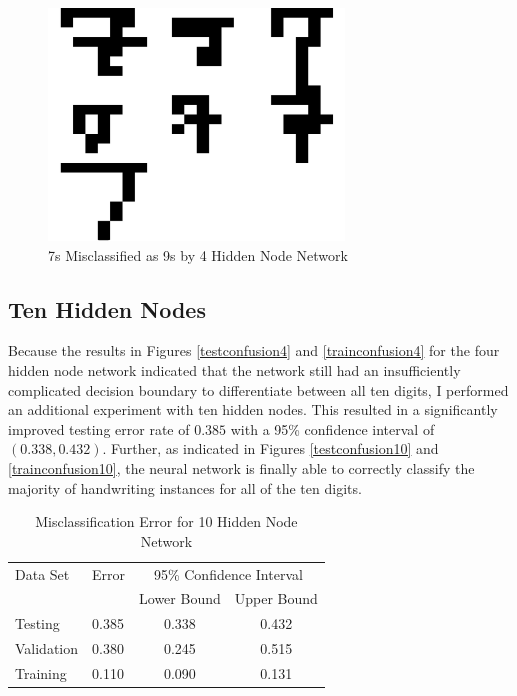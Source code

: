 \documentclass{article}
\begin{document}
\begin{figure}
\centering
\includegraphics[width=0.7\textwidth]{data/final/4_test_7missclass9.png}
\caption{7s Misclassified as 9s by 4 Hidden Node Network}
\label{4_7missclass9}
\end{figure}

\subsection{Ten Hidden Nodes}\label{hidden10}

Because the results in Figures \ref{testconfusion4} and \ref{trainconfusion4} for the four hidden node network indicated that the network still had an insufficiently complicated decision boundary to differentiate between all ten digits, I performed an additional experiment with ten hidden nodes. This resulted in a significantly improved testing error rate of \(0.385\) with a 95\% confidence interval of \((0.338 , 0.432)\). Further, as indicated in Figures \ref{testconfusion10} and \ref{trainconfusion10}, the neural network is finally able to correctly classify the majority of handwriting instances for all of the ten digits.

\begin{table}
\caption{Misclassification Error for 10 Hidden Node Network}
\begin{center}
\begin{tabular}{llcc}
\toprule
Data Set & Error & \multicolumn{2}{c}{95\% Confidence Interval} \\
\cmidrule(r){3-4}
& & Lower Bound & Upper Bound \\
\midrule
Testing       & 0.385 &  0.338 & 0.432  \\
Validation    & 0.380 &  0.245 & 0.515  \\
Training      & 0.110 &  0.090 & 0.131  \\
\bottomrule
\end{tabular}
\label{table10}
\end{center}
\end{table}
\end{document}
